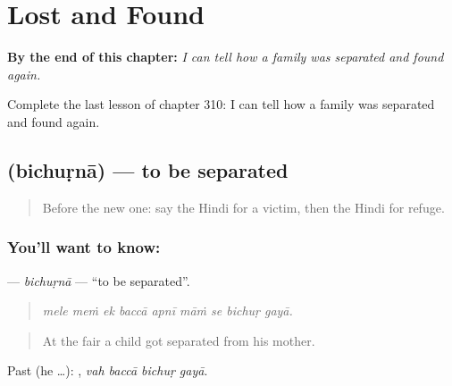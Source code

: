 
\chapter{Lost and Found}
\label{ch:hi-lost-and-found}

\begin{chapteropening}
\textbf{By the end of this chapter:} \emph{I can tell how a family was separated and found again.}

Complete the last lesson of chapter 310: I can tell how a family was separated and found again.
\end{chapteropening}

\section[\texorpdfstring{\hi{बिछुड़ना} (bichuṛnā)}{बिछुड़ना (bichuṛnā)}]{ (bichuṛnā) — to be separated}

\label{lesson:HI-C310-bichurna}



\begin{quote}
Before the new one: say the Hindi for a victim, then the Hindi for refuge.
\end{quote}

\subsection*{You'll want to know: }
\textbf{} — \emph{bichuṛnā} — \textquotedblleft{}to be separated\textquotedblright{}.

\begin{quote}
        
\end{quote}

\begin{quote}
\emph{mele meṁ ek baccā apnī māṁ se bichuṛ gayā.}
\end{quote}

\begin{quote}
At the fair a child got separated from his mother.
\end{quote}

Past (he …):    , \emph{vah baccā bichuṛ gayā}.

